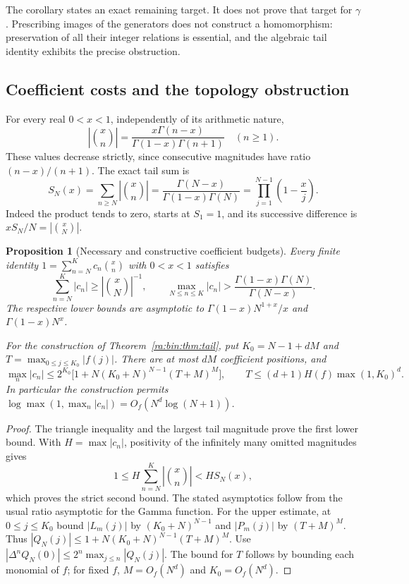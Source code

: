 \documentclass[11pt,a4paper]{article}
\newtheorem{proposition}[theorem]{Proposition}
\theoremstyle{definition}
\theoremstyle{remark}
\theoremstyle{plain}
\numberwithin{equation}{section}
\begin{document}
The corollary states an exact remaining target.  It does not prove
that target for $\gamma$.  Prescribing images of the generators
does not construct a homomorphism: preservation of all their
integer relations is essential, and the algebraic tail identity
exhibits the precise obstruction.

\subsection{Coefficient costs and the topology obstruction}

For every real $0<x<1$, independently of its arithmetic nature,
\[
 \left|\binom xn\right|
 =\frac{x\Gamma(n-x)}{\Gamma(1-x)\Gamma(n+1)}\quad(n\ge1).
\]
These values decrease strictly, since consecutive magnitudes have
ratio $(n-x)/(n+1)$.  The exact tail sum is
\[
 S_N(x)=\sum_{n\ge N}\left|\binom xn\right|
 =\frac{\Gamma(N-x)}{\Gamma(1-x)\Gamma(N)}
 =\prod_{j=1}^{N-1}\left(1-\frac{x}{j}\right).
\]
Indeed the product tends to zero, starts at $S_1=1$, and its
successive difference is $xS_N/N=|\binom xN|$.

\begin{proposition}[Necessary and constructive coefficient budgets]
\label{ra:bin:prop:cost}
Every finite identity $1=\sum_{n=N}^Kc_n\binom xn$ with
$0<x<1$ satisfies
\[
 \sum_{n=N}^K|c_n|\ge\left|\binom xN\right|^{-1},\qquad
 \max_{N\le n\le K}|c_n|>
 \frac{\Gamma(1-x)\Gamma(N)}{\Gamma(N-x)}.
\]
The respective lower bounds are asymptotic to
$\Gamma(1-x)N^{1+x}/x$ and $\Gamma(1-x)N^x$.

For the construction of Theorem~\ref{ra:bin:thm:tail}, put
$K_0=N-1+dM$ and $T=\max_{0\le j\le K_0}|f(j)|$.
There are at most $dM$ coefficient positions, and
\[
 \max_n|c_n|\le
 2^{K_0}\bigl[1+N(K_0+N)^{N-1}(T+M)^M\bigr],
 \qquad
 T\le(d+1)H(f)\max(1,K_0)^d.
\]
In particular the construction permits
$\log\max(1,\max_n|c_n|)=O_f(N^d\log(N+1))$.
\end{proposition}

\begin{proof}
The triangle inequality and the largest tail magnitude prove
the first lower bound.  With $H=\max|c_n|$, positivity of the
infinitely many omitted magnitudes gives
\[
 1\le H\sum_{n=N}^K\left|\binom xn\right|<HS_N(x),
\]
which proves the strict second bound.  The stated asymptotics
follow from the usual ratio asymptotic for the Gamma function.
For the upper estimate, at $0\le j\le K_0$ bound
$|L_m(j)|$ by $(K_0+N)^{N-1}$ and $|P_m(j)|$ by
$(T+M)^M$.  Thus
$|Q_N(j)|\le1+N(K_0+N)^{N-1}(T+M)^M$.
Use $|\Delta^nQ_N(0)|\le2^n\max_{j\le n}|Q_N(j)|$.
The bound for $T$ follows by bounding each monomial of $f$;
for fixed $f$, $M=O_f(N^d)$ and $K_0=O_f(N^d)$.
\end{proof}
\end{document}
